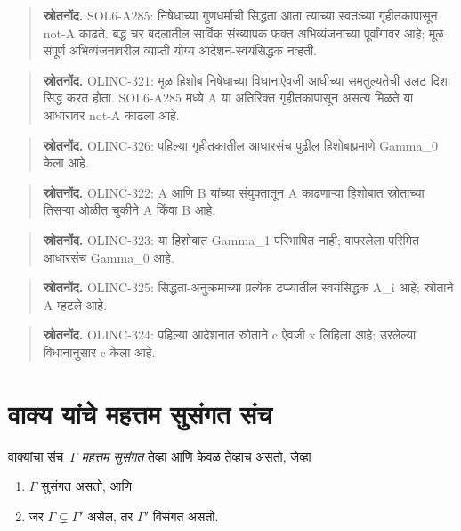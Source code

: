 \begin{quote}\small\textbf{स्रोतनोंद.} SOL6-A285: निषेधाच्या गुणधर्माची सिद्धता आता त्याच्या स्वतःच्या गृहीतकापासून not-A काढते. बद्ध चर बदलातील सार्विक संख्यापक फक्त अभिव्यंजनाच्या पूर्वांगावर आहे; मूळ संपूर्ण अभिव्यंजनावरील व्याप्ती योग्य आदेशन-स्वयंसिद्धक नव्हती.\end{quote}
\begin{quote}\small\textbf{स्रोतनोंद.} OLINC-321: मूळ हिशोब निषेधाच्या विधानाऐवजी आधीच्या समतुल्यतेची उलट दिशा सिद्ध करत होता. SOL6-A285 मध्ये A या अतिरिक्त गृहीतकापासून असत्य मिळते या आधारावर not-A काढला आहे.\end{quote}
\begin{quote}\small\textbf{स्रोतनोंद.} OLINC-326: पहिल्या गृहीतकातील आधारसंच पुढील हिशोबाप्रमाणे Gamma\_0 केला आहे.\end{quote}
\begin{quote}\small\textbf{स्रोतनोंद.} OLINC-322: A आणि B यांच्या संयुक्तातून A काढणाऱ्या हिशोबात स्रोताच्या तिसऱ्या ओळीत चुकीने A किंवा B आहे.\end{quote}
\begin{quote}\small\textbf{स्रोतनोंद.} OLINC-323: या हिशोबात Gamma\_1 परिभाषित नाही; वापरलेला परिमित आधारसंच Gamma\_0 आहे.\end{quote}
\begin{quote}\small\textbf{स्रोतनोंद.} OLINC-325: सिद्धता-अनुक्रमाच्या प्रत्येक टप्प्यातील स्वयंसिद्धक A\_i आहे; स्रोताने A म्हटले आहे.\end{quote}
\begin{quote}\small\textbf{स्रोतनोंद.} OLINC-324: पहिल्या आदेशनात स्रोताने c ऐवजी x लिहिला आहे; उरलेल्या विधानानुसार c केला आहे.\end{quote}











\section{वाक्य यांचे महत्तम सुसंगत संच}\label{fol:com:mcs:sec}

\begin{defn}[महत्तम सुसंगत संच]
\label{fol:com:mcs:mcs}
वाक्यांचा संच~$\Gamma$ \emph{महत्तम सुसंगत} तेव्हा आणि केवळ तेव्हाच असतो, जेव्हा
\begin{enumerate}
\item $\Gamma$ सुसंगत असतो, आणि
\item जर $\Gamma \subsetneq \Gamma'$ असेल, तर $\Gamma'$ विसंगत असतो.
\end{enumerate}
\end{defn}

